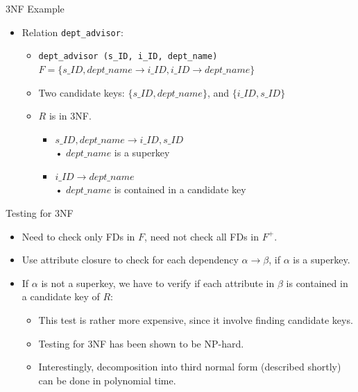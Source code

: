 \documentclass{beamer}
\begin{document}
\begin{frame}[fragile]{3NF Example}
    \begin{itemize}
        \item Relation \texttt{dept\_advisor}:
            \begin{itemize}
                \item \verb|dept_advisor (s_ID, i_ID, dept_name)| \\
                    $F = \{ s\_ID, dept\_name \rightarrow i\_ID, i\_ID \rightarrow dept\_name \}$
                \item Two candidate keys: $\{ s\_ID, dept\_name \}$, and $\{ i\_ID, s\_ID \}$
                \item $R$ is in 3NF.
                    \begin{itemize}
                        \item $s\_ID, dept\_name \rightarrow i\_ID, s\_ID$ \\
                            • $dept\_name$ is a superkey
                        \item $i\_ID \rightarrow dept\_name$ \\
                            • $dept\_name$ is contained in a candidate key
                    \end{itemize}
            \end{itemize}
    \end{itemize}
\end{frame}

\begin{frame}{Testing for 3NF}
    \begin{itemize}
        \item Need to check only FDs in $F$, need not check all FDs in $F^+$.
        \item Use attribute closure to check for each dependency $\alpha \rightarrow \beta$, if $\alpha$ is a superkey.
        \item If $\alpha$ is not a superkey, we have to verify if each attribute in $\beta$ is contained in a candidate key of $R$:
            \begin{itemize}
                \item This test is rather more expensive, since it involve finding candidate keys.
                \item Testing for 3NF has been shown to be NP-hard.
                \item Interestingly, decomposition into third normal form (described shortly) can be done in polynomial time.
            \end{itemize}
    \end{itemize}
\end{frame}
\end{document}
